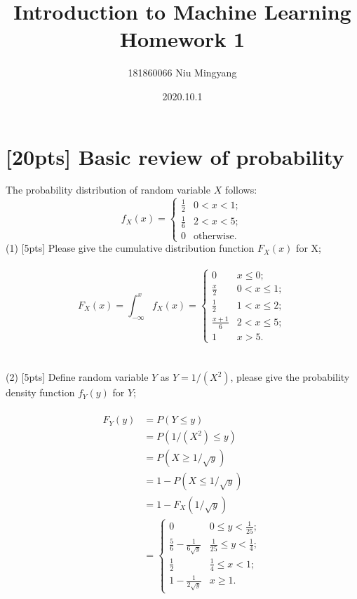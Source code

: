 \documentclass{article}
\title{Introduction to Machine Learning\\Homework 1}
\author{181860066 Niu Mingyang}
\date{2020.10.1}
\begin{document}
\maketitle

\section{[20pts] Basic review of probability}
The probability distribution of random variable $X$ follows:\\
\begin{equation}
f_X(x)=\begin{cases}
\frac{1}{2} & 0<x<1;\\
\frac{1}{6} & 2<x<5;\\
0 & \text{otherwise}.
\end{cases}
\end{equation} 
(1) [5pts] Please give the cumulative distribution function $F_X(x)$ for X;\\ \\
\begin{equation}
    F_X(x)=\int_{-\infty}^x f_X(x)=\begin{cases}
        0 & x\leq0;\\ 
        \frac{x}{2} & 0<x\leq1;\\
        \frac{1}{2} & 1<x\leq2;\\
        \frac{x+1}{6} & 2<x\leq5;\\
        1 & x>5.
        \end{cases} 
\end{equation}
\\ \\ 
(2) [5pts] Define random variable $Y$ as $Y=1/(X^2)$, please give the probability density function $f_Y(y)$ for $Y$;\\ \\
\begin{equation}
\begin{aligned}
    F_Y(y)&=P(Y \leq y)\\&=P(1/(X^2) \leq y)\\&=P(X \geq 1/\sqrt{y})\\&=1-P(X \leq 1/\sqrt{y})\\&=1-F_X(1/\sqrt{y})
    \\&=\begin{cases}
        0 & 0 \leq y<\frac{1}{25};\\ 
        \frac{5}{6} - \frac{1}{6\sqrt{y}} & \frac{1}{25} \leq y < \frac{1}{4};\\
        \frac{1}{2} & \frac{1}{4} \leq x < 1;\\
        1-\frac{1}{2\sqrt{y}} & x \geq 1.
    \end{cases}
\end{aligned}
\end{equation}
\end{document}
